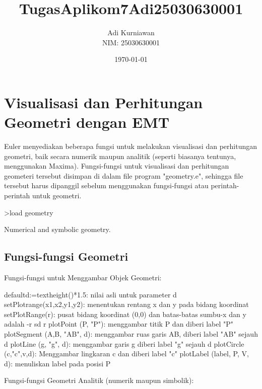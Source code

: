 \documentclass{article}
\title{TugasAplikom7Adi25030630001}
\author{Adi Kurniawan \\ NIM: 25030630001}
\date{\today}
\newenvironment{eulernotebook}{\par}{\par}
\newcommand{\eulerheading}[1]{\section{#1}}
\newcommand{\eulersubheading}[1]{\subsection{#1}}
\newenvironment{eulercomment}{\par\medskip}{\par\medskip}
\begin{document}
\maketitle

\begin{eulernotebook}
\eulerheading{Visualisasi dan Perhitungan Geometri dengan EMT}
\begin{eulercomment}
Euler menyediakan beberapa fungsi untuk melakukan visualisasi dan perhitungan geometri, baik
secara numerik maupun analitik (seperti biasanya tentunya, menggunakan Maxima).
Fungsi-fungsi untuk visualisasi dan perhitungan geometeri tersebut disimpan di dalam file
program "geometry.e", sehingga file tersebut harus dipanggil sebelum menggunakan
fungsi-fungsi atau perintah-perintah untuk geometri.
\end{eulercomment}
\begin{eulerprompt}
>load geometry
\end{eulerprompt}
\begin{euleroutput}
  Numerical and symbolic geometry.
\end{euleroutput}
\eulersubheading{Fungsi-fungsi Geometri}
\begin{eulercomment}
Fungsi-fungsi untuk Menggambar Objek Geometri:

\end{eulercomment}
\begin{eulerttcomment}
  defaultd:=textheight()*1.5: nilai asli untuk parameter d
  setPlotrange(x1,x2,y1,y2): menentukan rentang x dan y pada bidang koordinat
  setPlotRange(r): pusat bidang koordinat (0,0) dan batas-batas sumbu-x dan y adalah -r sd r
  plotPoint (P, "P"): menggambar titik P dan diberi label "P"
  plotSegment (A,B, "AB", d): menggambar ruas garis AB, diberi label "AB" sejauh d
  plotLine (g, "g", d): menggambar garis g diberi label "g" sejauh d
  plotCircle (c,"c",v,d): Menggambar lingkaran c dan diberi label "c"
  plotLabel (label, P, V, d): menuliskan label pada posisi P
\end{eulerttcomment}
\begin{eulercomment}

Fungsi-fungsi Geometri Analitik (numerik maupun simbolik):


\end{eulercomment}
\end{eulernotebook}
\end{document}
